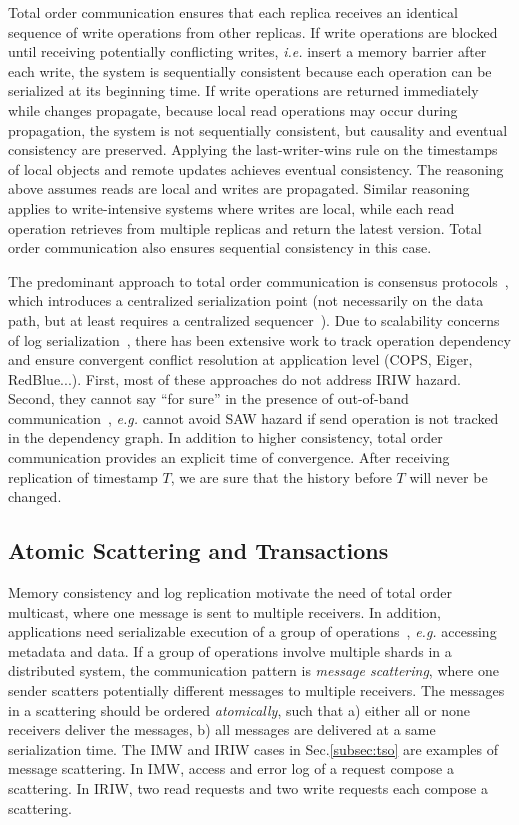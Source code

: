Total order communication ensures that each replica receives an identical sequence of write operations from other replicas. If write operations are blocked until receiving potentially conflicting writes, \textit{i.e.} insert a memory barrier after each write, the system is sequentially consistent because each operation can be serialized at its beginning time. If write operations are returned immediately while changes propagate, because local read operations may occur during propagation, the system is not sequentially consistent, but causality and eventual consistency are preserved. Applying the last-writer-wins rule  on the timestamps of local objects and remote updates achieves eventual consistency. The reasoning above assumes reads are local and writes are propagated. Similar reasoning applies to write-intensive systems where writes are local, while each read operation retrieves from multiple replicas and return the latest version. Total order communication also ensures sequential consistency in this case.

The predominant approach to total order communication is consensus protocols~\cite{lamport1998part,raft}, which introduces a centralized serialization point (not necessarily on the data path, but at least requires a centralized sequencer~\cite{kaminsky2016design}). Due to scalability concerns of log serialization~\cite{anna}, there has been extensive work to track operation dependency and ensure convergent conflict resolution at application level (COPS, Eiger, RedBlue...). First, most of these approaches do not address IRIW hazard. Second, they cannot say ``for sure'' in the presence of out-of-band communication~\cite{cheriton1994understanding}, \textit{e.g.} cannot avoid SAW hazard if send operation is not tracked in the dependency graph. In addition to higher consistency, total order communication provides an explicit time of convergence. After receiving replication of timestamp $T$, we are sure that the history before $T$ will never be changed.

\subsection{Atomic Scattering and Transactions}
\label{subsec:transactional-kvs}

Memory consistency and log replication motivate the need of total order multicast, where one message is sent to multiple receivers. In addition, applications need serializable execution of a group of operations~\cite{cheriton1994understanding}, \textit{e.g.} accessing metadata and data. If a group of operations involve multiple shards in a distributed system, the communication pattern is \textit{message scattering}, where one sender scatters potentially different messages to multiple receivers. The messages in a scattering should be ordered \textit{atomically}, such that a) either all or none receivers deliver the messages, b) all messages are delivered at a same serialization time. The IMW and IRIW cases in Sec.\ref{subsec:tso} are examples of message scattering. In IMW, access and error log of a request compose a scattering. In IRIW, two read requests and two write requests each compose a scattering.

